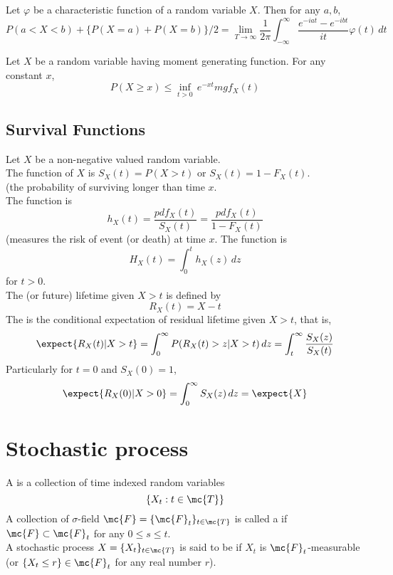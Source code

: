 \documentclass[11pt]{article}
\begin{document}
Let $\varphi$ be a characteristic function of a random variable $X$. Then for any $a, b$,
$$P(a < X < b) + \{P(X=a) + P(X=b)\}/2 = \underset{T \rightarrow \infty}{\lim} \frac{1}{2\pi} \int_{-\infty}^\infty \frac{e^{-iat} - e^{-ibt}}{it} \varphi(t) \, dt$$

Let $X$ be a random variable having moment generating function. For any constant $x$,
$$P(X \geq x) \leq \underset{t > 0}{\inf}\,e^{-xt}mgf_X(t)$$

\subsection{Survival Functions}
Let $X$ be a non-negative valued random variable. \\
The  function of $X$ is $S_X(t) = P(X > t)$ or $S_X(t) = 1 - F_X(t)$. \\
(the probability of surviving longer than time $x$.\\
The  function is
$$h_X(t) = \frac{pdf_X(t)}{S_X(t)} = \frac{pdf_X(t)}{1-F_X(t)}$$
(measures the risk of event (or death) at time $x$.
The  function is
$$H_X(t) = \int_0^t h_X(z) \, dz$$ for $t > 0$. \\
The  (or future) lifetime given $X > t$ is defined by
$$R_X(t) = X - t$$
The  is the conditional expectation of residual lifetime given $X > t$, that is,
\begin{align}
	\expect{R_X(t) | X > t} = \int_0^\infty P(R_X(t) > z |X > t)\, dz = \int_t^\infty \frac{S_X(z)}{S_X(t)}
\end{align}
Particularly for $t = 0$ and $S_X(0) = 1$,
$$\expect{R_X(0)|X>0} = \int_0^\infty S_X(z) \, dz = \expect{X}$$

\section{Stochastic process}
A  is a collection of time indexed random variables $$\{X_t: t \in \mc{T}\}$$
A collection of $\sigma$-field $\mc{F} = \{\mc{F}_t\}_{t \in \mc{T}}$ is called a  if $\mc{F} \subset \mc{F}_t$ for any $0 \leq s \leq t$. \\
A stochastic process $X = \{X_t\}_{t \in \mc{T}}$ is said to be  if $X_t$ is $\mc{F}_t$-measurable (or $\{X_t \leq r\} \in \mc{F}_t$ for any real number $r$).
\end{document}
